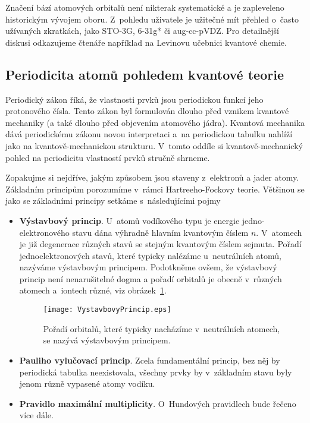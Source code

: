 Značení bází atomových orbitalů není nikterak systematické a je zapleveleno historickým vývojem oboru. Z~pohledu uživatele je užitečné mít přehled o~často užívaných zkratkách, jako STO-3G, 6-31g* či aug-cc-pVDZ. Pro detailnější diskusi odkazujeme čtenáře například na Levinovu učebnici kvantové chemie.


\subsection{Periodicita atomů pohledem kvantové teorie}
   
Periodický zákon říká, že vlastnosti prvků jsou periodickou funkcí jeho protonového čísla. Tento zákon byl formulován dlouho před vznikem kvantové mechaniky (a také dlouho před objevením atomového jádra). Kvantová mechanika dává periodickému zákonu novou interpretaci a~na periodickou tabulku nahlíží jako na kvantově-mechanickou strukturu. V~tomto oddíle si kvantově-mechanický pohled na periodicitu vlastností prvků stručně shrneme. 

Zopakujme si nejdříve, jakým způsobem jsou staveny z~elektronů a jader atomy. Základním principům porozumíme v~rámci Hartreeho-Fockovy teorie. Většinou se jako se základními principy setkáme s~následujícími pojmy

\begin{itemize}
\item \textbf{Výstavbový princip}. U~atomů vodíkového typu je energie jedno-elektronového stavu dána výhradně hlavním kvantovým číslem $n$. V~atomech je již degenerace různých stavů se stejným kvantovým číslem sejmuta. Pořadí jednoelektronových stavů, které typicky nalézáme u~neutrálních atomů, nazýváme výstavbovým principem. Podotkněme ovšem, že výstavbový princip není nenarušitelné dogma a pořadí orbitalů je obecně v~různých atomech a~iontech různé, viz obrázek~\ref{obr:Aufbau}.

\begin{figure} [htb]
\centering
\texttt{[image: VystavbovyPrincip.eps]}
\caption[Výstavbový princip]{Pořadí orbitalů, které typicky nacházíme v~neutrálních atomech, se nazývá výstavbovým principem.}
\label{obr:Aufbau}
\end{figure}

\item \textbf{Pauliho vylučovací princip}. Zcela fundamentální princip, bez něj by periodická tabulka neexistovala, všechny prvky by v~základním stavu byly jenom různě vypasené atomy vodíku.

\item \textbf{Pravidlo maximální multiplicity}. O~Hundových pravidlech bude řečeno více dále.   
 
\end{itemize}

